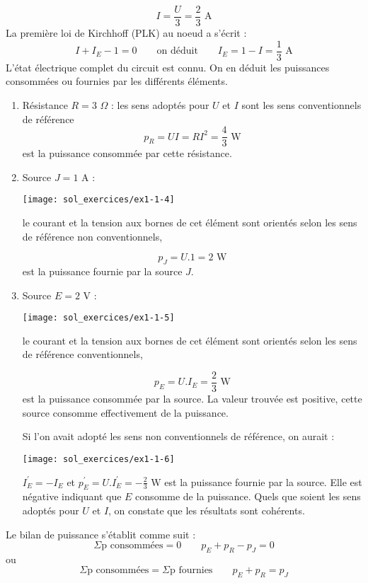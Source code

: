 \[I=\frac{U}{3}=\frac{2}{3}\text{~A}\]
La première loi de Kirchhoff (PLK) au noeud a s'écrit :
\[I+I_E-1=0 \qquad \text{on déduit} \qquad
I_E=1-I=\frac{1}{3}\text{~A}\]
L'état électrique complet du circuit est connu. On en déduit les
puissances consommées ou fournies par les différents éléments. 
\begin{enumerate}
	\item Résistance $R=3\,\, \Omega$ : les sens adoptés pour $U$ et $I$
	sont les sens conventionnels de référence
	\[p_{R}=UI=RI^2=\frac{4}{3}\text{~W}\]
	est la puissance consommée par cette résistance.
	\item Source $J=1$ A : 
	
	\begin{minipage}[c]{3cm}
		\begin{center}
			\texttt{[image: sol\_exercices/ex1-1-4]}
		\end{center}
	\end{minipage}
	\begin{minipage}[c]{7cm}
		le courant et la  tension aux bornes de cet élément sont orientés
		selon les sens de référence non conventionnels,
	\end{minipage}
	\[p_{J}=U.1=2\text{~W}\]
	est la puissance fournie par la source $J$.
	\item Source $E=2$ V : 
	
	\begin{minipage}[c]{3cm}
		\begin{center}
			\texttt{[image: sol\_exercices/ex1-1-5]}
		\end{center}
	\end{minipage}
	\begin{minipage}[c]{7cm}
		le courant et la tension aux bornes de cet élément sont orientés
		selon les sens de référence conventionnels,
	\end{minipage}
	\[p_{E}=U.I_E=\frac{2}{3}\text{~W}\]
	est la puissance consommée par la source. La valeur trouvée est
	positive, cette source consomme effectivement de la puissance.
	
	Si l'on avait adopté les sens non conventionnels de référence, on
	aurait :\\[3mm]
	\begin{minipage}[c]{3cm}
		\begin{center}
			\texttt{[image: sol\_exercices/ex1-1-6]}
		\end{center}
	\end{minipage}
	\begin{minipage}[c]{7cm}
		$I^{'}_E=-I_E$ et 
		$p^{'}_{E}=U.I^{'}_E=-\frac{2}{3}\text{~W}$
		est la puissance fournie par la source. Elle est négative indiquant
		que $E$ consomme  de la puissance. Quels que soient les sens adoptés
		pour $U$ et $I$, on constate que les résultats sont cohérents.
	\end{minipage}
\end{enumerate}
Le bilan de puissance s'établit comme suit :
\[\Sigma \text{p consommées}=0 \qquad p_E+p_R-p_J=0\]
ou
\[\Sigma \text{p consommées}=\Sigma \text{p fournies} \qquad
p_E+p_R=p_J\]


